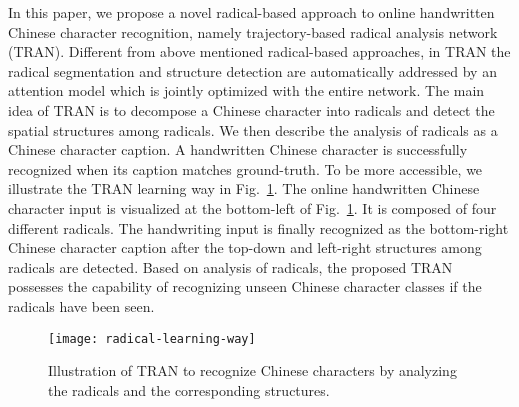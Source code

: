 \documentclass[a4paper,conference]{IEEEtran}
\begin{document}
In this paper, we propose a novel radical-based approach to online handwritten Chinese character recognition, namely trajectory-based radical analysis network (TRAN). Different from above mentioned radical-based approaches, in TRAN the radical segmentation and structure detection are automatically addressed by an attention model which is jointly optimized with the entire network. The main idea of TRAN is to decompose a Chinese character into radicals and detect the spatial structures among radicals. We then describe the analysis of radicals as a Chinese character caption. A handwritten Chinese character is successfully recognized when its caption matches ground-truth. To be more accessible, we illustrate the TRAN learning way in Fig.~\ref{fig:radical-learning-way}. The online handwritten Chinese character input is visualized at the bottom-left of Fig.~\ref{fig:radical-learning-way}. It is composed of four different radicals. The handwriting input is finally recognized as the bottom-right Chinese character caption after the top-down and left-right structures among radicals are detected. Based on analysis of radicals, the proposed TRAN possesses the capability of recognizing unseen Chinese character classes if the radicals have been seen.

\begin{figure}
\centering
\texttt{[image: radical-learning-way]}
\caption{Illustration of TRAN to recognize Chinese characters by analyzing the radicals and the corresponding structures.}
\label{fig:radical-learning-way}
\end{figure}
\end{document}
